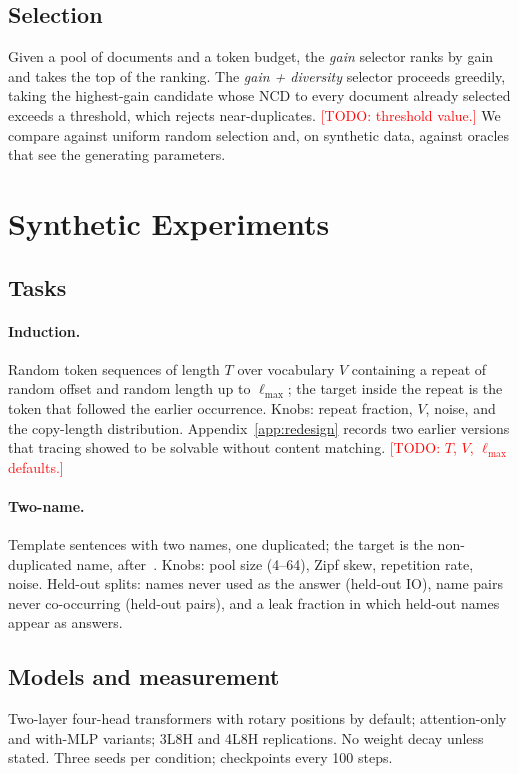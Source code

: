 \documentclass[11pt]{article}
\newcommand{\todo}[1]{\textcolor{red}{[TODO: #1]}}
\newcommand{\ncd}{\mathrm{NCD}}
\begin{document}
\subsection{Selection}
Given a pool of documents and a token budget, the \emph{gain} selector
ranks by gain and takes the top of the ranking. The \emph{gain + diversity}
selector proceeds greedily, taking the highest-gain candidate whose $\ncd$
to every document already selected exceeds a threshold, which rejects
near-duplicates. \todo{threshold value.} We compare against uniform random
selection and, on synthetic data, against oracles that see the generating
parameters.

\section{Synthetic Experiments}\label{sec:synth}

\subsection{Tasks}
\paragraph{Induction.} Random token sequences of length $T$ over vocabulary
$V$ containing a repeat of random offset and random length up to
$\ell_{\max}$; the target inside the repeat is the token that followed the
earlier occurrence. Knobs: repeat fraction, $V$, noise, and the copy-length
distribution. Appendix~\ref{app:redesign} records two earlier versions that
tracing showed to be solvable without content matching.
\todo{$T$, $V$, $\ell_{\max}$ defaults.}

\paragraph{Two-name.} Template sentences with two names, one duplicated;
the target is the non-duplicated name, after~\citet{wang2022ioi}. Knobs:
pool size (4--64), Zipf skew, repetition rate, noise. Held-out splits: names
never used as the answer (held-out IO), name pairs never co-occurring
(held-out pairs), and a leak fraction in which held-out names appear as
answers.

\subsection{Models and measurement}
Two-layer four-head transformers with rotary positions by default;
attention-only and with-MLP variants; 3L8H and 4L8H replications. No
weight decay unless stated. Three seeds per condition; checkpoints every
100 steps.
\end{document}
